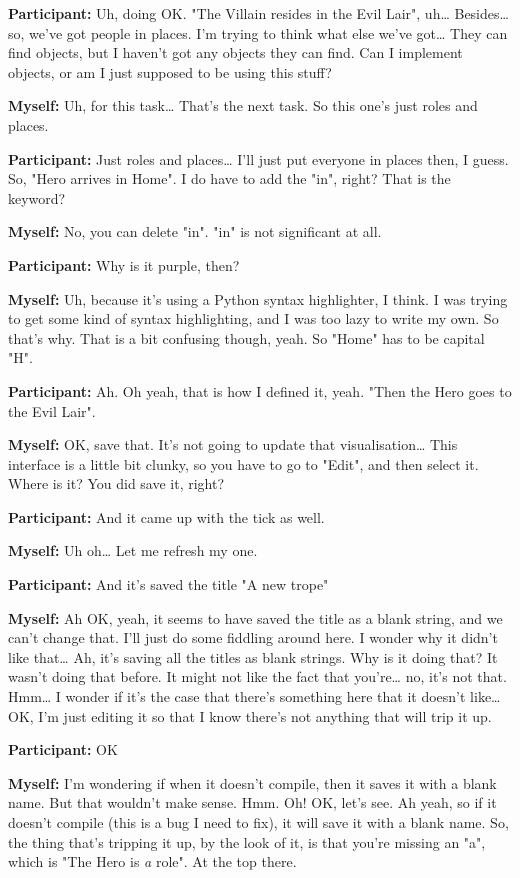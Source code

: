 \documentclass[11pt]{report}
\begin{document}
\begin{linenumbers}
\textbf{Participant:} Uh, doing OK. "The Villain resides in the Evil Lair", uh\ldots{} Besides\ldots{} so, we've got people in places. I'm trying to think what else we've got\ldots{} They can find objects, but I haven't got any objects they can find. Can I implement objects, or am I just supposed to be using this stuff?

\textbf{Myself:} Uh, for this task\ldots{} That's the next task. So this one's just roles and places.

\textbf{Participant:} Just roles and places\ldots{} I'll just put everyone in places then, I guess. So, "Hero arrives in Home". I do have to add the "in", right? That is the keyword?

\textbf{Myself:} No, you can delete "in". "in" is not significant at all.

\textbf{Participant:} Why is it purple, then?

\textbf{Myself:} Uh, because it's using a Python syntax highlighter, I think. I was trying to get some kind of syntax highlighting, and I was too lazy to write my own. So that's why. That is a bit confusing though, yeah. So "Home" has to be capital "H".

\textbf{Participant:} Ah. Oh yeah, that is how I defined it, yeah. "Then the Hero goes to the Evil Lair".

\textbf{Myself:} OK, save that. It's not going to update that visualisation\ldots{} This interface is a little bit clunky, so you have to go to "Edit", and then select it. Where is it? You did save it, right?

\textbf{Participant:} And it came up with the tick as well.

\textbf{Myself:} Uh oh\ldots{} Let me refresh my one.

\textbf{Participant:} And it's saved the title "A new trope"

\textbf{Myself:} Ah OK, yeah, it seems to have saved the title as a blank string, and we can't change that. I'll just do some fiddling around here. I wonder why it didn't like that\ldots{} Ah, it's saving all the titles as blank strings. Why is it doing that? It wasn't doing that before. It might not like the fact that you're\ldots{} no, it's not that. Hmm\ldots{} I wonder if it's the case that there's something here that it doesn't like\ldots{} OK, I'm just editing it so that I know there's not anything that will trip it up.

\textbf{Participant:} OK

\textbf{Myself:} I'm wondering if when it doesn't compile, then it saves it with a blank name. But that wouldn't make sense. Hmm. Oh! OK, let's see. Ah yeah, so if it doesn't compile (this is a bug I need to fix), it will save it with a blank name. So, the thing that's tripping it up, by the look of it, is that you're missing an "a", which is "The Hero is \emph{a} role". At the top there.


\end{linenumbers}
\end{document}
